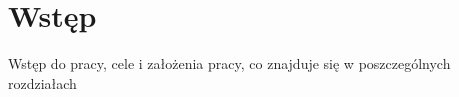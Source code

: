 \chapter{Wstęp}
\label{cha:wstep}
Wstęp do pracy, cele i założenia pracy, co znajduje się w poszczególnych rozdziałach

















